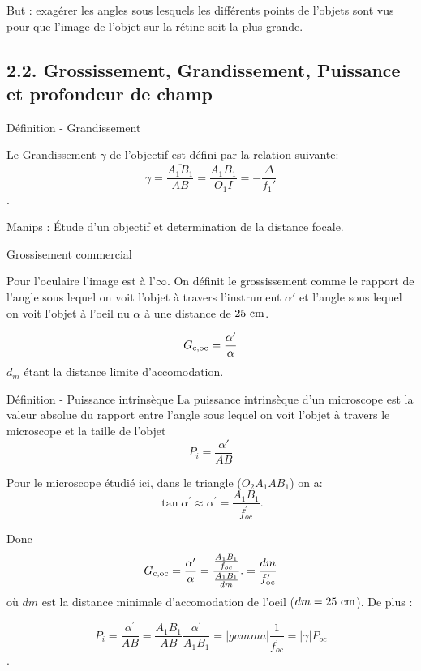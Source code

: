 \documentclass[french, a4paper, 10pt, twocolumn, landscape]{article}
\begin{document}
But : exagérer les angles sous lesquels les différents points de l'objets sont vus pour que l'image de l'objet sur la rétine soit la plus grande.


\subsection*{2.2. Grossissement, Grandissement, Puissance et profondeur de champ}

	\begin{definition}{Définition - Grandissement}

		Le Grandissement $\gamma$ de l'objectif est défini par la relation suivante:
		$$\gamma = \frac{\overline{A_1B_1}}{AB} = \frac{A_1B_1}{O_1I}=-\frac{\Delta}{f_1'}$$.
	\end{definition}

Manips : Étude d'un objectif et determination de la distance focale.


	\begin{definition}{Grossisement commercial}

		Pour l'oculaire l'image est à l'$\infty$. On définit le grossissement comme le rapport de l'angle sous lequel on voit l'objet à travers l'instrument $\alpha'$ et l'angle sous lequel on voit l'objet à l'oeil nu $\alpha$ à une distance de $25~\rm cm$. 

		$$G_{\rm c,oc} = \frac{\alpha'}{\alpha}$$
		$d_m$ étant la distance limite d'accomodation.
	\end{definition}


	\begin{definition}{Définition - Puissance intrinsèque}
		La puissance intrinsèque d’un microscope est la valeur absolue du rapport entre l’angle sous lequel on voit l’objet à travers le microscope et la taille de l’objet
		$$P_i = \frac{\alpha'}{AB}$$
	\end{definition}

Pour le microscope étudié ici, dans le triangle ($O_2A_1AB_1$) on a: $$\tan\alpha^\prime \approx \alpha^\prime = \frac{A_1B_1}{f_{oc}^\prime}.$$ 


Donc $$G_{\rm c,oc} = \frac{\alpha^\prime}{\alpha} = \frac{\frac{A_1B_1}{f_{oc}}}{\frac{A_1B_1}{dm}}. = \frac{dm}{f_{\rm oc}^\prime}$$
où $dm$ est la distance minimale d'accomodation de l'oeil ($dm=25~\rm cm$). De plus : 

$$P_i = \frac{\alpha^\prime}{AB} = \frac{A_1B_1}{AB}\frac{\alpha^\prime}{A_1B_1}= |gamma|\frac{1}{f_{oc}^\prime}=|\gamma|P_{oc}$$.
\end{document}

